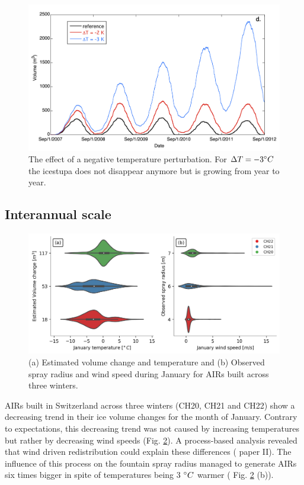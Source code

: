 \begin{figure}[htb]
  \centering
	\includegraphics[width=\textwidth]{figs/PIR_evolution.png}
  \caption{The effect of a negative temperature perturbation. For $\Delta T = -3 ^{\circ} C$ the icestupa does
  not disappear anymore but is growing from year to year.}
\label{fig:PIR_evolution}
\end{figure}

\subsection{Interannual scale}
\label{sec:interannual}

\begin{figure}[htb]
\centering
\includegraphics[width=\textwidth]{figs/CH_diffs.jpg}
\caption{(a) Estimated volume change and temperature and (b) Observed spray radius and wind speed
during January for AIRs built across three winters. } 
\label{fig:CH_diffs}
\end{figure}

AIRs built in Switzerland across three winters (CH20, CH21 and CH22) show a decreasing trend in their ice volume
changes for the month of January. Contrary to expectations, this decreasing trend was not caused by increasing
temperatures but rather by decreasing wind speeds (Fig. \ref{fig:CH_diffs}). A process-based analysis  revealed
that wind driven redistribution could explain these differences ( paper II). The influence of this process on
the fountain spray radius managed to generate AIRs six times bigger in spite of temperatures being 3 $^{\circ} C$
warmer ( Fig. \ref{fig:CH_diffs} (b)). 



